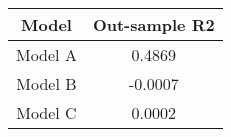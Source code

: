 \begin{tabular}{cc}
\hline
  Model  &  Out-sample R2  \\
\hline
 Model A &     0.4869      \\
 Model B &     -0.0007     \\
 Model C &     0.0002      \\
\hline
\end{tabular}